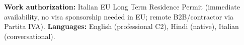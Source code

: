 \documentclass[a4paper,10pt]{article}
\begin{document}
\vspace{2pt}
{\small \textbf{Work authorization:} Italian EU Long Term Residence Permit (immediate availability, no visa sponsorship needed in EU; remote B2B/contractor via Partita IVA). \quad \textbf{Languages:} English (professional C2), Hindi (native), Italian (conversational).}
\end{document}

